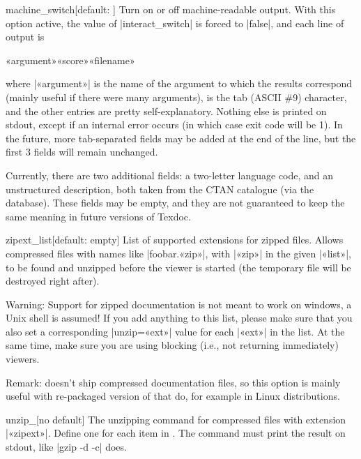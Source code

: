 \documentclass[draft]{texdoc-doc}
\begin{document}
\begin{confitem}{machine\_switch}{}[default: ]
Turn on or off machine-readable output. With this option active, the value of
|interact_switch| is forced to |false|, and each line of output is
%
\begin{htcode}
«argument»\metatab«score»\metatab«filename»
\end{htcode}
%
where |«argument»| is the name of the argument to which the results correspond
(mainly useful if there were many arguments), {\metatab} is the tab (ASCII \#9)
character, and the other entries are pretty self-explanatory. Nothing else is
printed on stdout, except if an internal error occurs (in which case exit code
will be 1). In the future, more tab-separated fields may be added at the end
of the line, but the first 3 fields will remain unchanged.

Currently, there are two additional fields: a two-letter language code, and an
unstructured description, both taken from the CTAN catalogue (via the {\TL}
database). These fields may be empty, and they are not guaranteed to keep the
same meaning in future versions of Texdoc.
\end{confitem}

\begin{confitem}{zipext\_list}{}[default: empty]
List of supported extensions for zipped files. Allows compressed files with
names like |foobar.«zip»|, with |«zip»| in the given |«list»|, to be found and
unzipped before the viewer is started (the temporary file will be destroyed
right after).

Warning: Support for zipped documentation is not meant to work on windows, a
Unix shell is assumed! If you add anything to this list, please make sure that
you also set a corresponding |unzip=«ext»| value for each |«ext»| in the list.
At the same time, make sure you are using blocking (i.e., not returning
immediately) viewers.

Remark: {\TL} doesn't ship compressed documentation files, so this option is
mainly useful with re-packaged version of {\TL} that do, for example in Linux
distributions.
\end{confitem}

\begin{confitem}{unzip\_}{}[no default]
The unzipping command for compressed files with extension |«zipext»|. Define
one for each item in . The command must print the result on
stdout, like |gzip -d -c| does.
\end{confitem}
\end{document}
